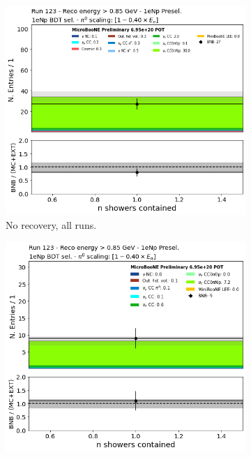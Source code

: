 \begin{figure}[H]
    \centering
    \begin{subfigure}{0.35\textwidth}
    \includegraphics[width=1.00\textwidth]{Sidebands/Figures/CutUpdates/norecovery-allruns.png}
    \caption{No recovery, all runs.}
    \end{subfigure}
    \begin{subfigure}{0.35\textwidth}
    \includegraphics[width=1.00\textwidth]{Sidebands/Figures/CutUpdates/recovery-allruns.png}

\end{subfigure}
\end{figure}
